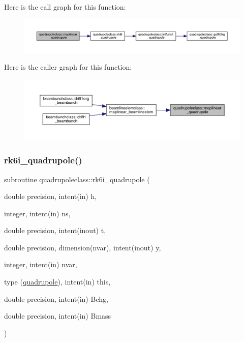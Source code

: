 Here is the call graph for this function\+:\nopagebreak
\begin{figure}[H]
\begin{center}
\leavevmode
\includegraphics[width=350pt]{namespacequadrupoleclass_adcdf5386d19cfb0a90cbc42426cf0d44_cgraph}
\end{center}
\end{figure}
Here is the caller graph for this function\+:\nopagebreak
\begin{figure}[H]
\begin{center}
\leavevmode
\includegraphics[width=350pt]{namespacequadrupoleclass_adcdf5386d19cfb0a90cbc42426cf0d44_icgraph}
\end{center}
\end{figure}
\mbox{\label{namespacequadrupoleclass_a156f69f00644d8511e9f1ee150504b83}} 
\subsubsection{\texorpdfstring{rk6i\_quadrupole()}{rk6i\_quadrupole()}}
{\footnotesize\ttfamily subroutine quadrupoleclass\+::rk6i\+\_\+quadrupole (\begin{DoxyParamCaption}\item[{double precision, intent(in)}]{h,  }\item[{integer, intent(in)}]{ns,  }\item[{double precision, intent(inout)}]{t,  }\item[{double precision, dimension(nvar), intent(inout)}]{y,  }\item[{integer, intent(in)}]{nvar,  }\item[{type (\mbox{\hyperlink{namespacequadrupoleclass_structquadrupoleclass_1_1quadrupole}{quadrupole}}), intent(in)}]{this,  }\item[{double precision, intent(in)}]{Bchg,  }\item[{double precision, intent(in)}]{Bmass }\end{DoxyParamCaption})}

